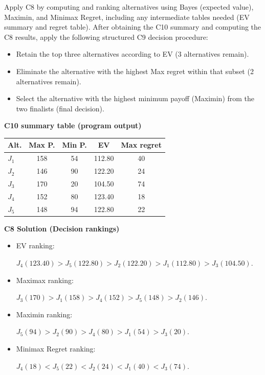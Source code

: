 \begin{ExamProblems}
		Apply C8 by computing and ranking alternatives using Bayes (expected value), Maximin, and Minimax Regret, including any intermediate tables needed (EV summary and regret table).
		After obtaining the C10 summary and computing the C8 results, apply the following structured C9 decision procedure:
		\begin{itemize}
			\item Retain the top three alternatives according to EV (3 alternatives remain).
			\item Eliminate the alternative with the highest Max regret within that subset (2 alternatives remain).
			\item Select the alternative with the highest minimum payoff (Maximin) from the two finalists (final decision).
		\end{itemize}
		
		\vspace{0.25cm}
		
		\textbf{C10 summary table (program output)}\par
		\begin{center}
			\begin{tabular}{l c c c c}
				\hline
				Alt. & Max P. & Min P. & EV & Max regret \\
				\hline
				$J_1$ & 158 & 54 & 112.80 & 40 \\
				$J_2$ & 146 & 90 & 122.20 & 24 \\
				$J_3$ & 170 & 20 & 104.50 & 74 \\
				$J_4$ & 152 & 80 & 123.40 & 18 \\
				$J_5$ & 148 & 94 & 122.80 & 22 \\
				\hline
			\end{tabular}
		\end{center}
		
		\textbf{C8 Solution (Decision rankings)}\par
		\begin{itemize}
			\item EV ranking: \par $J_4(123.40)>J_5(122.80)>J_2(122.20)>J_1(112.80)>J_3(104.50)$.
			\item Maximax ranking:\par $J_3(170)>J_1(158)>J_4(152)>J_5(148)>J_2(146)$.
			\item Maximin ranking: \par $J_5(94)>J_2(90)>J_4(80)>J_1(54)>J_3(20)$.
			\item Minimax Regret ranking:\par $J_4(18)<J_5(22)<J_2(24)<J_1(40)<J_3(74)$.
		\end{itemize}
		

\end{ExamProblems}

